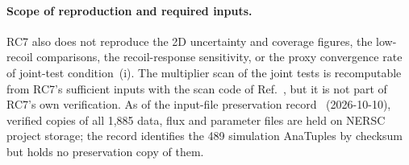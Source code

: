 \paragraph{Scope of reproduction and required inputs.} RC7 also does not reproduce the 2D uncertainty and coverage figures, the low-recoil comparisons, the recoil-response sensitivity, or the proxy convergence rate of joint-test condition~(i). The multiplier scan of the joint tests is recomputable from RC7's sufficient inputs with the scan code of Ref.~\cite{JointTestKappa2026}, but it is not part of RC7's own verification. As of the input-file preservation record~\cite{AnaTuplePreservation2026} (2026-10-10), verified copies of all 1,885 data, flux and parameter files are held on NERSC project storage; the record identifies the 489 simulation AnaTuples by checksum but holds no preservation copy of them.
